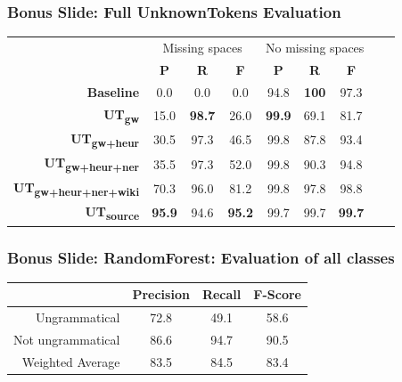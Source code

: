 \documentclass[table]{beamer}
\begin{document}
\begin{frame}
  \frametitle{Bonus Slide: Full \textbf{UnknownTokens} Evaluation}
  \begin{tabular}{r|c|c|c|c|c|c|c|c|}
  & \multicolumn{3}{c|}{Missing spaces} & \multicolumn{3}{c|}{No missing spaces}\\
  & \textbf{P} & \textbf{R} & \textbf{F} & \textbf{P} & \textbf{R} & \textbf{F}\\
  \hline
  \textbf{Baseline} & 0.0 & 0.0 & 0.0 & 94.8 & \textbf{100} & 97.3\\
  \hline\hline
  \textbf{UT\textsubscript{gw}} & 15.0 & \textbf{98.7} & 26.0 & \textbf{99.9} & 69.1 & 81.7\\
  \hline
  \textbf{UT\textsubscript{gw+heur}} & 30.5 & 97.3 & 46.5 & 99.8 & 87.8 & 93.4\\
  \hline
  \textbf{UT\textsubscript{gw+heur+ner}} & 35.5 & 97.3 & 52.0 & 99.8 & 90.3 & 94.8\\
  \hline
  \textbf{UT\textsubscript{gw+heur+ner+wiki}} & 70.3 & 96.0 & 81.2 & 99.8 & 97.8 & 98.8\\
  \hline\hline
  \textbf{UT\textsubscript{source}} & \textbf{95.9} & 94.6 & \textbf{95.2} & 99.7 & 99.7 & \textbf{99.7}\\
  \hline
  \end{tabular}
\end{frame}

\begin{frame}
  \frametitle{Bonus Slide: \textbf{RandomForest}: Evaluation of all classes}
  \quad\quad\begin{tabular}{r|c|c|c|}
  & \textbf{Precision} & \textbf{Recall} & \textbf{F-Score}\\
  \hline
  Ungrammatical & 72.8 & 49.1 & 58.6\\
  \hline\pause
  Not ungrammatical & 86.6 & 94.7 & 90.5\\
  \hline
  Weighted Average & 83.5 & 84.5 & 83.4\\
  \hline
  \end{tabular}
\end{frame}
\end{document}
